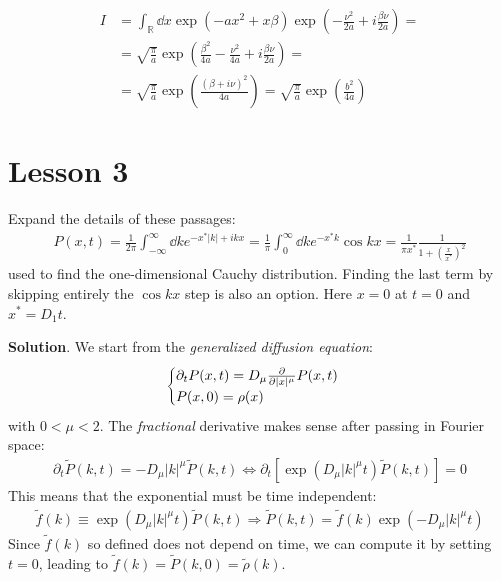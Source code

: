 \documentclass[../template.tex]{subfiles}
\begin{document}
\begin{exo}
    \begin{align*}
        I &= \int_{\mathbb{R}} \dd{x} \exp(-ax^2 + x \beta) \exp\left(-\frac{\nu^2}{2a} + i\frac{\beta \nu}{2a}  \right) =\\
        &= \sqrt{\frac{\pi}{a}} \exp\left(\frac{\beta^2}{4a} - \frac{\nu^2}{4a} + i\frac{\beta \nu}{2a}   \right) =\\
        &= \sqrt{\frac{\pi}{a} } \exp\left(\frac{(\beta + i \nu)^2}{4a}  \right)= \sqrt{\frac{\pi}{a} } \exp\left(\frac{b^2}{4a} \right)
    \end{align*}
\end{exo}

\chapter{Lesson 3}
\begin{exo}
    Expand the details of these passages:
    \begin{align*}
        P(x, t)=\frac{1}{2 \pi} \int_{-\infty}^{\infty} \dd{k} e^{-x^{*}|k|+i k x}=\frac{1}{\pi} \int_{0}^{\infty} \dd{k} e^{-x^{*} k} \cos k x=\frac{1}{\pi x^{*}} \frac{1}{1+\left(\frac{x}{x^{*}}\right)^{2}}
    \end{align*}
    used to find the one-dimensional Cauchy distribution. Finding the last term by skipping entirely the $\cos kx$ step is also an option. Here $x=0$ at $t=0$ and $x^* = D_1t$.
    \medskip

\textbf{Solution}. We start from the \textit{generalized diffusion equation}:
\begin{align*}
    \begin{cases}
        \partial_t P(x,t) = D_\mu \pdv{|x|^\mu} P(x,t)\\
        P(x,0) = \rho(x)
    \end{cases}
\end{align*} 
with $0 < \mu < 2$. The \textit{fractional} derivative makes sense after passing in Fourier space:
\begin{align*}
    \partial_t \tilde{P}(k,t) = - D_{\mu}|k|^\mu \tilde{P}(k,t) \Leftrightarrow \partial_t[ \exp(D_\mu |k|^\mu t) \tilde{P}(k,t)] = 0
\end{align*} 
This means that the exponential must be time independent:
\begin{align*}
    \tilde{f}(k) \equiv \exp(D_{\mu} |k|^\mu t) \tilde{P}(k,t) \Rightarrow \tilde{P}(k,t) = \tilde{f}(k) \exp(-D_\mu |k|^\mu t)
\end{align*}
Since $\tilde{f}(k)$ so defined does not depend on time, we can compute it by setting $t=0$, leading to $\tilde{f}(k) = \tilde{P}(k,0) = \tilde{\rho}(k)$. 


\end{exo}
\end{document}
